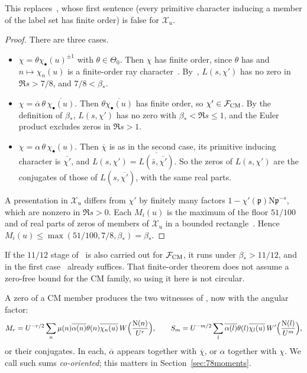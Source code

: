 \documentclass[11pt]{article}
\numberwithin{equation}{section}
\newcommand{\N}{\mathrm N}
\begin{document}
This replaces~\cite[Section~8.1]{OAI78}, whose first sentence (every primitive character inducing a member of the
label set has finite order) is false for $\mathcal X_u$.
\begin{proof}
There are three cases.
\begin{itemize}
\item $\chi=\theta\chi_\bullet(u)^{\pm1}$ with $\theta\in\Theta_0$. Then $\chi$ has finite order, since $\theta$ has and
 $n\mapsto\chi_n(u)$ is a finite-order ray character~\cite[Lemma~4.1]{OAI78}.
 By~\cite[Theorem~1.1]{OAI78}, $L(s,\chi')$ has no zero in $\Re s>7/8$, and $7/8<\beta_*$.
\item $\chi=\overline\alpha\,\theta\,\overline{\chi_\bullet(u)}$. Then $\theta\overline{\chi_\bullet(u)}$ has finite order, so
 $\chi'\in\mathcal F_{\rm CM}$. By the definition of $\beta_*$, $L(s,\chi')$ has no zero with
 $\beta_*<\Re s\le1$, and the Euler product excludes zeros in $\Re s>1$.
\item $\chi=\alpha\,\theta\,\chi_\bullet(u)$. Then $\overline\chi$ is as in the second case, its primitive inducing
 character is $\overline{\chi'}$, and $L(s,\chi')=\overline{L(\bar s,\overline{\chi'})}$. So the zeros of $L(s,\chi')$ are
 the conjugates of those of $L(s,\overline{\chi'})$, with the same real parts.
\end{itemize}
A presentation in $\mathcal X_u$ differs from $\chi'$ by finitely many factors $1-\chi'(\mathfrak p)\N\mathfrak p^{-s}$, which
are nonzero in $\Re s>0$. Each $M_i(u)$ is the maximum of the floor $51/100$ and of real parts of zeros of members
of $\mathcal X_u$ in a bounded rectangle~\cite[Section~8.1]{OAI78}. Hence
$M_i(u)\le\max(51/100,7/8,\beta_*)=\beta_*$.
\end{proof}
If the $11/12$ stage of~\cite{OAI78} is also carried out for $\mathcal F_{\rm CM}$, it runs under $\beta_*>11/12$, and
in the first case~\cite[Theorem~3.1]{OAI78} already suffices.
That finite-order theorem does not assume a zero-free bound for the CM family,
so using it here is not circular.

A zero of a CM member produces the two witnesses of \cite[\S3.3]{G78}, now with the
angular factor:
\begin{equation}\label{eq:d080}
 M_r=U^{-r/2}\sum_n\mu(n)\overline{\alpha(n)}\theta(n)\overline{\chi_n(u)}\,W\Bigl(\frac{\N(n)}{U^r}\Bigr),
 \qquad
 S_m=U^{-m/2}\sum_l\overline{\alpha(l)}\theta(l)\overline{\chi_l(u)}\,W'\Bigl(\frac{\N(l)}{U^m}\Bigr),
\end{equation}
or their conjugates. In each, $\overline\alpha$ appears together with $\overline\chi$, or $\alpha$ together
with $\chi$. We call such sums \emph{co-oriented}; this matters in
Section~\ref{sec:78moments}.
\end{document}
